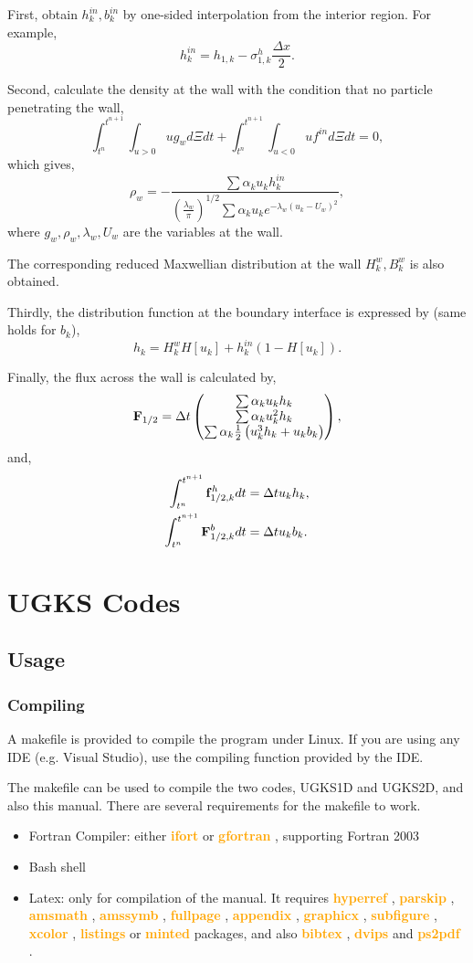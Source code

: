 \documentclass[a4paper]{book}
\newcommand{\hi}[1]{
    \textbf{\textcolor{orange}{#1}}
}
\begin{document}
First, obtain $h_k^{in},b_k^{in}$ by one-sided interpolation from the interior region. For example,
$$h_{k}^{in} = h_{1,k}-\sigma_{1,k}^h\frac{\Delta x}{2}.$$

Second, calculate the density at the wall with the condition that no particle penetrating the wall,
$$\int_{t^n}^{t^{n+1}}\int_{u>0} ug_w d\Xi dt+\int_{t^n}^{t^{n+1}}\int_{u<0} uf^{in}d\Xi dt=0,$$
which gives,
$$\rho_w = -\frac{\sum\alpha_k u_k h_k^{in}}{\left(\frac{\lambda_w}{\pi}\right)^{1/2}\sum\alpha_k u_k e^{-\lambda_w(u_k-U_w)^2}},$$
where $g_w,\rho_w,\lambda_w,U_w$ are the variables at the wall.

The corresponding reduced Maxwellian distribution at the wall $H_k^w,B_k^w$ is also obtained.

Thirdly, the distribution function at the boundary interface is expressed by (same holds for $b_k$),
$$h_k = H_k^wH[u_k]+h_k^{in}(1-H[u_k]).$$

Finally, the flux across the wall is calculated by,
$$
{\bf F}_{1/2} = \Delta t
\begin{pmatrix}
    \sum\alpha_k u_k h_k\\
    \sum\alpha_k u_k^2 h_k\\
    \sum\alpha_k \frac{1}{2}\left(u_k^3 h_k+u_k b_k\right)
\end{pmatrix},
$$
and,
$$
\begin{aligned}
    \int_{t^n}^{t^{n+1}}{\bf f}_{1/2,k}^h dt &= \Delta t u_k h_k,\\
    \int_{t^n}^{t^{n+1}}{\bf F}_{1/2,k}^b dt &= \Delta t u_k b_k.
\end{aligned} 
$$

\chapter{UGKS Codes}
\section{Usage}
\subsection{Compiling}
A makefile is provided to compile the program under Linux. If you are using any IDE (e.g. Visual Studio), use the compiling function provided by the IDE.

The makefile can be used to compile the two codes, UGKS1D and UGKS2D, and also this manual. There are several requirements for the makefile to work.
\begin{itemize}
    \item Fortran Compiler: either \hi{ifort} or \hi{gfortran}, supporting Fortran 2003
    \item Bash shell
    \item Latex: only for compilation of the manual. It requires \hi{hyperref}, \hi{parskip}, \hi{amsmath}, \hi{amssymb}, \hi{fullpage}, \hi{appendix}, \hi{graphicx}, \hi{subfigure}, \hi{xcolor}, \hi{listings} or \hi{minted} packages, and also \hi{bibtex}, \hi{dvips} and \hi{ps2pdf}.
\end{itemize}
\end{document}
